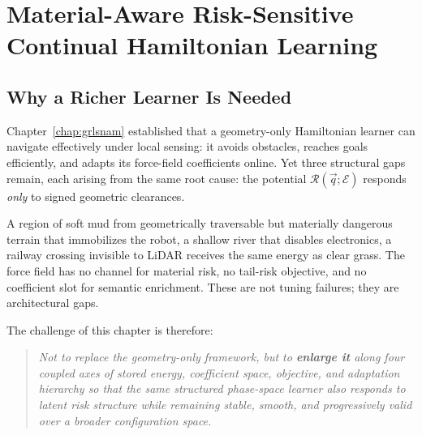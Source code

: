 
\chapter{Material-Aware Risk-Sensitive Continual Hamiltonian Learning}
\label{chap:material}

\providecommand{\Ham}{\mathcal{H}}
\providecommand{\Potential}{\mathcal{R}}
\providecommand{\PhaseState}{z}
\providecommand{\Pos}{q}
\providecommand{\Mom}{p}
\providecommand{\Mass}{\mathrm{M}}
\providecommand{\J}{\mathbb{J}}

\section{Why a Richer Learner Is Needed}
\label{sec:ch4:motivation}

Chapter~\ref{chap:grlsnam} established that a geometry-only Hamiltonian
learner can navigate effectively under local sensing: it avoids obstacles,
reaches goals efficiently, and adapts its force-field coefficients online.
Yet three structural gaps remain, each arising from the same root cause:
the potential $\Potential(\vec{q};\mathcal{E})$ responds \emph{only} to
signed geometric clearances.

A region of soft mud from geometrically traversable but materially dangerous terrain 
that immobilizes the robot, a shallow river that disables electronics,
a railway crossing invisible to LiDAR receives the same energy as clear
grass.
The force field has no channel for material risk, no tail-risk objective,
and no coefficient slot for semantic enrichment.
These are not tuning failures; they are architectural gaps.

The challenge of this chapter is therefore:

\begin{quote}\itshape
Not to replace the geometry-only framework, but to \textbf{enlarge it}
along four coupled axes of stored energy, coefficient space, objective, and
adaptation hierarchy so that the same structured phase-space learner also
responds to latent risk structure while remaining stable, smooth, and
progressively valid over a broader configuration space.
\end{quote}

